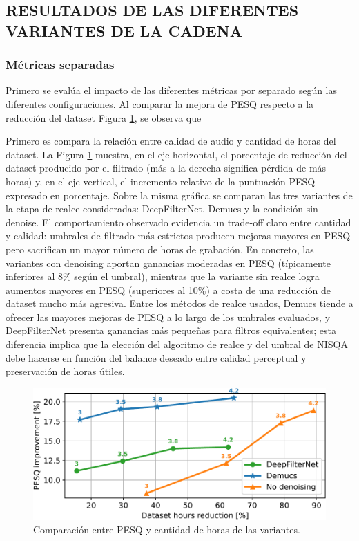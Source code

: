 \subsection{RESULTADOS DE LAS DIFERENTES VARIANTES DE LA CADENA}
\subsubsection{Métricas separadas}
Primero se evalúa el impacto de las diferentes métricas por separado según las diferentes configuraciones. 
Al comparar la mejora de PESQ respecto a la reducción del dataset Figura \ref{fig:horas_vs_pesq}, se observa que 

Primero es compara la relación entre calidad de audio y cantidad de horas del dataset. La Figura \ref{fig:horas_vs_pesq} muestra, en el eje horizontal, el porcentaje de reducción del dataset producido por el filtrado (más a la derecha significa pérdida de más horas) y, en el eje vertical, el incremento relativo de la puntuación PESQ expresado en porcentaje. Sobre la misma gráfica se comparan las tres variantes de la etapa de realce consideradas: DeepFilterNet, Demucs y la condición sin denoise. El comportamiento observado evidencia un trade-off claro entre cantidad y calidad: umbrales de filtrado más estrictos producen mejoras mayores en PESQ pero sacrifican un mayor número de horas de grabación. En concreto, las variantes con denoising aportan ganancias moderadas en PESQ (típicamente inferiores al 8\% según el umbral), mientras que la variante sin realce logra aumentos mayores en PESQ (superiores al 10\%) a costa de una reducción de dataset mucho más agresiva. Entre los métodos de realce usados, Demucs tiende a ofrecer las mayores mejoras de PESQ a lo largo de los umbrales evaluados, y DeepFilterNet presenta ganancias más pequeñas para filtros equivalentes; esta diferencia implica que la elección del algoritmo de realce y del umbral de NISQA debe hacerse en función del balance deseado entre calidad perceptual y preservación de horas útiles.

\begin{figure}[h]
  \centering
  \centerline{\includegraphics[width=15cm]{Figuras/Pipeline/pesq vs horas bien.pdf}}
  \caption{Comparación entre PESQ y cantidad de horas de las variantes.}
    \label{fig:horas_vs_pesq}
\end{figure}

